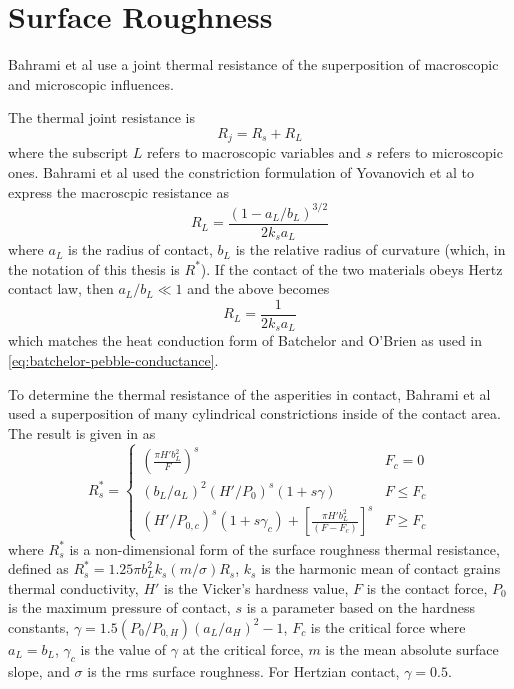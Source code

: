 \chapter{Surface Roughness}\label{sec:granular-contact-roughness}
Bahrami et al use a joint thermal resistance of the superposition of macroscopic and microscopic influences.\cite{Bahrami2004}

The thermal joint resistance is
\begin{equation}
	R_j = R_s + R_L
\end{equation}
where the subscript $L$ refers to macroscopic variables and $s$ refers to microscopic ones. Bahrami et al used the constriction formulation of Yovanovich et al to express the macroscpic resistance as\cite{Yovanovich1976}
\begin{equation}
	R_L = \frac{(1-a_L/b_L)^{3/2}}{2k_sa_L}
\end{equation}
where $a_L$ is the radius of contact, $b_L$ is the relative radius of curvature (which, in the notation of this thesis is $R^*$). If the contact of the two materials obeys Hertz contact law, then $a_L/b_L \ll 1$ and the above becomes
\begin{equation}\label{eq:macro-thermal-resistance}
	R_L = \frac{1}{2k_sa_L}
\end{equation}
which matches the heat conduction form of Batchelor and O'Brien\cite{Batchelor1977} as used in \cref{eq:batchelor-pebble-conductance}.

To determine the thermal resistance of the asperities in contact, Bahrami et al used a superposition of many cylindrical constrictions inside of the contact area. The result is given in \cite{Bahrami2004} as
\begin{equation}
	R_s^* = \begin{cases}
	\left(\frac{\pi H'b_L^2}{F} \right)^s 										& F_c = 0\\
	(b_L/a_L)^2(H'/P_0)^s(1+s\gamma) 										& F \le F_c\\
	(H'/P_{0,c})^s(1+s\gamma_c)+\left[\frac{\pi H'b_L^2}{(F-F_c)}\right]^s				& F\ge F_c
	\end{cases}
\end{equation}
where $R_s^*$ is a non-dimensional form of the surface roughness thermal resistance, defined as $R_s^* = 1.25\pi b_L^2k_s(m/\sigma)R_s$, $k_s$ is the harmonic mean of contact grains thermal conductivity, $H'$ is the Vicker's hardness value, $F$ is the contact force, $P_0$ is the maximum pressure of contact, $s$ is a parameter based on the hardness constants, $\gamma = 1.5(P_0/P_{0,H})(a_L/a_H)^2-1$, $F_c$ is the critical force where $a_L = b_L$, $\gamma_c$ is the value of $\gamma$ at the critical force, $m$ is the mean absolute surface slope, and $\sigma$ is the rms surface roughness. For Hertzian contact, $\gamma = 0.5$.

